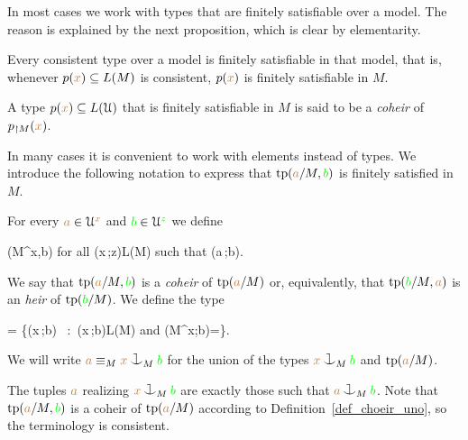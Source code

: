 In most cases we work with types that are finitely satisfiable over a model.
The reason is explained by the next proposition, which is clear by elementarity.

\begin{proposition}\label{prop_coher_over_model}
  Every consistent type over a model is finitely satisfiable in that model, that is, whenever $p({\color{brown} x})\subseteq L(M)$ is consistent, $p({\color{brown} x})$ is finitely satisfiable in $M$.
\end{proposition}

\begin{definition}\label{def_choeir_uno}
  A type $p({\color{brown} x}) \subseteq L(\EuScript U)$ that is finitely satisfiable in $M$ is said to be a \emph{coheir\/} of $p_{\restriction M}({\color{brown} x})$.
\end{definition}

In many cases it is convenient to work with elements instead of types.
We introduce the following notation to express that ${\rm tp}({\color{brown} a}/M,{\color{green} b})$ is finitely satisfied in $M$.

\begin{definition}\label{def_coheir_idepencence}
  For every ${\color{brown} a}\in\EuScript U^{\color{brown} x}$ and ${\color{green} b}\in\EuScript U^{\color{green} z}$ we define

  \noindent\llap{\textcolor{red}{\Large\warning}\kern1.5ex}
  {\IFF}
  {\phi(M^{\mr x},{\gr b})\neq\varnothing
  \textrm{ for all }\phi({\mr x}\,;{\gr z})\in L(M) 
  \textrm{ such that }\phi({\mr a}\,;{\gr b})}.

  We say that ${\rm tp}({\color{brown} a}/M,{\color{green} b})$ is a \emph{coheir} of ${\rm tp}({\color{brown} a}/M)$ or, equivalently, that ${\rm tp}({\color{green} b}/M,{\color{brown} a})$ is an \emph{heir} of ${\rm tp}({\color{green} b}/M)$.
  We define the type

  {=}
  {\Big\{\neg\phi({\mr x}\,;{\gr b})
  \ :\ 
  \phi({\mr x}\,;{\gr b})\in L(M)
  \textrm{ and } \phi(M^{\mr x};{\gr b})=\varnothing\Big\}.}

  We will write \emph{${\mr a}\equiv_M{\mr x}\cnonfork_M{\gr b}$} for the union of the types ${\mr x}\cnonfork_M{\gr b}$ and ${\rm tp}({\color{brown} a}/M)$.
\end{definition}

The tuples ${\color{brown} a}$ realizing ${\mr x}\cnonfork_M{\gr b}$ are exactly those such that ${\mr a}\cnonfork_M{\gr b}$.
Note that ${\rm tp}({\color{brown} a}/M,{\color{green} b})$ is a coheir of ${\rm tp}({\color{brown} a}/M)$ according to Definition~\ref{def_choeir_uno}, so the terminology is consistent.

